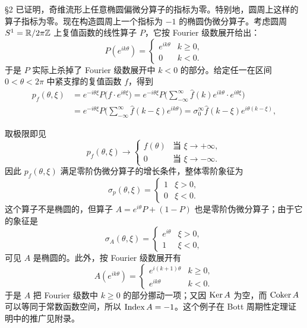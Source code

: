 \begin{example}
§2 已证明，奇维流形上任意椭圆偏微分算子的指标为零。特别地，圆周上这样的算子指标为零。现在构造圆周上一个指标为 $-1$ 的椭圆伪微分算子。考虑圆周 $S^1=\mathbb{R}/2\pi\mathbb{Z}$ 上复值函数的线性算子 $P$，它按 Fourier 级数展开给出：
\[
P(e^{ik\theta})=
\begin{cases}
e^{ik\theta} & k\ge 0,\\
0 & k<0.
\end{cases}
\]
于是 $P$ 实际上杀掉了 Fourier 级数展开中 $k<0$ 的部分。给定任一在区间 $0<\theta<2\pi$ 中紧支撑的复值函数 $f$，得到
\[
\begin{aligned}
p_f(\theta,\xi)&=e^{-i\theta\xi}P\big(f\cdot e^{i\theta\xi}\big)
=e^{-i\theta\xi}P\Big(\sum_{-\infty}^{\infty}\hat f(k)e^{ik\theta}\cdot e^{i\theta\xi}\Big)\\
&=e^{-i\theta\xi}P\Big(\sum_{-\infty}^{\infty}\hat f(k-\xi)e^{ik\theta}\Big)
=\sigma_0^{\infty}\hat f(k-\xi)e^{i\theta(k-\xi)},
\end{aligned}
\]


取极限即见
\[
p_f(\theta,\xi)\to
\begin{cases}
f(\theta) & \text{当 }\xi\to+\infty,\\
0 & \text{当 }\xi\to-\infty.
\end{cases}
\]
因此 $p_f(\theta,\xi)$ 满足零阶伪微分算子的增长条件，整体零阶象征为
\[
\sigma_p(\theta,\xi)=
\begin{cases}
1 & \xi>0,\\
0 & \xi<0.
\end{cases}
\]
这个算子不是椭圆的，但算子 $A=e^{i\theta}P+(1-P)$ 也是零阶伪微分算子；由于它的象征是
\[
\sigma_A(\theta,\xi)=
\begin{cases}
e^{i\theta} & \xi>0,\\
1 & \xi<0,
\end{cases}
\]
可见 $A$ 是椭圆的。此外，按 Fourier 级数展开有
\[
A(e^{ik\theta})=
\begin{cases}
e^{i(k+1)\theta} & k\ge 0,\\
e^{ik\theta} & k<0.
\end{cases}
\]
于是 $A$ 把 Fourier 级数中 $k\ge 0$ 的部分挪动一项；又因 $\operatorname{Ker} A$ 为空，而 $\operatorname{Coker} A$ 可以等同于常数函数空间，所以 $\operatorname{Index} A=-1$。这个例子在 Bott 周期性定理证明中的推广见附录。
\end{example}

